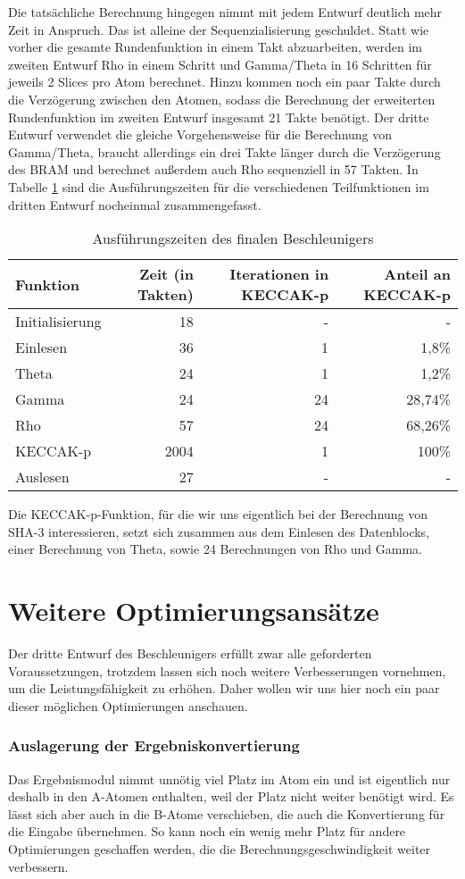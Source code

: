 Die tatsächliche Berechnung hingegen nimmt mit jedem Entwurf deutlich mehr Zeit in Anspruch. Das ist alleine der Sequenzialisierung geschuldet.
Statt wie vorher die gesamte Rundenfunktion in einem Takt abzuarbeiten, werden im zweiten Entwurf Rho in einem Schritt und Gamma/Theta in 16 Schritten für jeweils 2 Slices pro Atom berechnet.
Hinzu kommen noch ein paar Takte durch die Verzögerung zwischen den Atomen, sodass die Berechnung der erweiterten Rundenfunktion im zweiten Entwurf insgesamt 21 Takte benötigt.
Der dritte Entwurf verwendet die gleiche Vorgehensweise für die Berechnung von Gamma/Theta, braucht allerdings ein drei Takte länger durch die Verzögerung des BRAM
und berechnet außerdem auch Rho sequenziell in 57 Takten. In Tabelle \ref{tab:zeiten_iteration_3} sind die Ausführungszeiten
für die verschiedenen Teilfunktionen im dritten Entwurf nocheinmal zusammengefasst.
\begin{table}
    \centering
    \begin{tabular}{lrrr}
    Funktion & Zeit (in Takten) & Iterationen in KECCAK-p & Anteil an KECCAK-p \\
    \hline
    Initialisierung & 18 & - & - \\
    Einlesen & 36 & 1 & 1,8\% \\
    Theta & 24 & 1 & 1,2\% \\
    Gamma & 24 & 24 & 28,74\% \\
    Rho & 57 & 24 & 68,26\% \\
    KECCAK-p & 2004 & 1 & 100\% \\
    Auslesen & 27 & - & -
    \end{tabular}
    \label{tab:zeiten_iteration_3}
    \caption{Ausführungszeiten des finalen Beschleunigers}
\end{table}
Die KECCAK-p-Funktion, für die wir uns eigentlich bei der Berechnung von SHA-3 interessieren, setzt sich zusammen aus dem Einlesen des Datenblocks,
einer Berechnung von Theta, sowie 24 Berechnungen von Rho und Gamma.

\section{Weitere Optimierungsansätze}
Der dritte Entwurf des Beschleunigers erfüllt zwar alle geforderten Voraussetzungen, trotzdem lassen sich noch weitere Verbesserungen vornehmen, um die Leistungsfähigkeit zu erhöhen.
Daher wollen wir uns hier noch ein paar dieser möglichen Optimierungen anschauen.

\subsubsection{Auslagerung der Ergebniskonvertierung}
Das Ergebnismodul nimmt unnötig viel Platz im Atom ein und ist eigentlich nur deshalb in den A-Atomen enthalten, weil der Platz nicht weiter benötigt wird.
Es lässt sich aber auch in die B-Atome verschieben, die auch die Konvertierung für die Eingabe übernehmen.
So kann noch ein wenig mehr Platz für andere Optimierungen geschaffen werden, die die Berechnungsgeschwindigkeit weiter verbessern.

